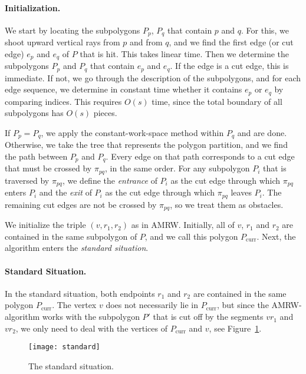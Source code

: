 \documentclass[11pt,a4paper]{article}
\begin{document}
\paragraph{Initialization.}
We start by locating the subpolygons
$P_p$, $P_q$ that contain $p$ and $q$. For this, we shoot upward
vertical rays from $p$ and from $q$, and we find the first edge (or cut edge)
$e_p$ and $e_q$ of $P$ that is hit. This takes linear time.
Then we determine the subpolygons
$P_p$ and $P_q$ that contain $e_p$ and $e_q$. If the edge is a cut edge, this
is immediate. If not, we go through the description of the subpolygons, and
for each edge sequence, we determine in
constant time whether it contains $e_p$ or $e_q$ by comparing indices.
This requires $O(s)$ time, since the total boundary of all  subpolygons
has $O(s)$ pieces.



If $P_p = P_q$, we
apply the constant-work-space method within $P_q$ and are done. Otherwise,
we take the tree that represents the polygon partition, and we find the path
between $P_p$ and $P_q$. Every edge on that path
corresponds to a cut edge that must be crossed by $\pi_{pq}$,
in the same order. For any subpolygon $P_i$ that is traversed by $\pi_{pq}$,
we define the \emph{entrance} of $P_i$ as the cut edge
through which $\pi_{pq}$ enters $P_i$ and the \emph{exit} of $P_i$ as
the cut edge through which $\pi_{pq}$ leaves $P_i$.
The remaining cut edges
are not be crossed by $\pi_{pq}$, so
we treat them as obstacles.

We initialize the triple $(v, r_1, r_2)$ as in AMRW.
Initially, all of $v$, $r_1$ and $r_2$ are contained in the same subpolygon
of $P$, and we call this polygon $P_{\mathrm{curr}}$.
Next, the algorithm enters the \emph{standard situation}.




\paragraph{Standard Situation.}
In the standard situation, both endpoints $r_1$ and $r_2$ are contained
in the same polygon $P_\text{curr}$. The vertex $v$ does not necessarily lie
in $P_\text{curr}$, but since the AMRW-algorithm works with the subpolygon
$P'$ that is cut off by the segments $vr_1$ and $vr_2$, we only need to
deal with the vertices of $P_\text{curr}$ and $v$, see Figure~\ref{fig:standard}.

\begin{figure}[htb]
 \centerline{\texttt{[image: standard]}}
\caption{The standard situation.}
 \label{fig:standard}
\end{figure}
\end{document}
